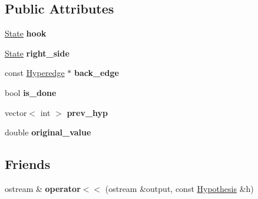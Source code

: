 \subsection*{Public Attributes}
\begin{DoxyCompactItemize}
\item 
\hypertarget{structScarab_1_1HG_1_1Hypothesis_a53277642394df6145ea8bfc6a3e3996e}{
\hyperlink{structScarab_1_1HG_1_1State}{State} {\bfseries hook}}
\label{structScarab_1_1HG_1_1Hypothesis_a53277642394df6145ea8bfc6a3e3996e}

\item 
\hypertarget{structScarab_1_1HG_1_1Hypothesis_aff1779905d4f7e9a21b71a20cec4f02d}{
\hyperlink{structScarab_1_1HG_1_1State}{State} {\bfseries right\_\-side}}
\label{structScarab_1_1HG_1_1Hypothesis_aff1779905d4f7e9a21b71a20cec4f02d}

\item 
\hypertarget{structScarab_1_1HG_1_1Hypothesis_aa31a2d052ecaffa034d8447de748946f}{
const \hyperlink{classScarab_1_1HG_1_1Hyperedge}{Hyperedge} $\ast$ {\bfseries back\_\-edge}}
\label{structScarab_1_1HG_1_1Hypothesis_aa31a2d052ecaffa034d8447de748946f}

\item 
\hypertarget{structScarab_1_1HG_1_1Hypothesis_a38b1068d18fe3ce28d6c93e5d12b2225}{
bool {\bfseries is\_\-done}}
\label{structScarab_1_1HG_1_1Hypothesis_a38b1068d18fe3ce28d6c93e5d12b2225}

\item 
\hypertarget{structScarab_1_1HG_1_1Hypothesis_a93bf33767cecd362e8a12d385c94be1a}{
vector$<$ int $>$ {\bfseries prev\_\-hyp}}
\label{structScarab_1_1HG_1_1Hypothesis_a93bf33767cecd362e8a12d385c94be1a}

\item 
\hypertarget{structScarab_1_1HG_1_1Hypothesis_a95df46740f1263062f4898db1b39cd41}{
double {\bfseries original\_\-value}}
\label{structScarab_1_1HG_1_1Hypothesis_a95df46740f1263062f4898db1b39cd41}

\end{DoxyCompactItemize}
\subsection*{Friends}
\begin{DoxyCompactItemize}
\item 
\hypertarget{structScarab_1_1HG_1_1Hypothesis_a70fdb92646880290a9c906e5018c11bb}{
ostream \& {\bfseries operator$<$$<$} (ostream \&output, const \hyperlink{structScarab_1_1HG_1_1Hypothesis}{Hypothesis} \&h)}
\label{structScarab_1_1HG_1_1Hypothesis_a70fdb92646880290a9c906e5018c11bb}

\end{DoxyCompactItemize}


